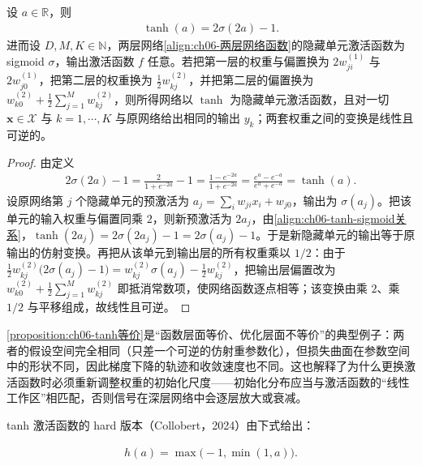 \documentclass[../../main.tex]{subfiles}
\begin{document}
\begin{proposition}\label{proposition:ch06-tanh等价}
设 $a\in\mathbb{R}$，则
\begin{align}
\tanh(a)=2\sigma(2a)-1 .
\label{align:ch06-tanh-sigmoid关系}
\end{align}
进而设 $D,M,K\in\mathbb{N}$，两层网络\eqref{align:ch06-两层网络函数}的隐藏单元激活函数为 sigmoid $\sigma$，输出激活函数 $f$ 任意。若把第一层的权重与偏置换为 $2w_{ji}^{(1)}$ 与 $2w_{j0}^{(1)}$，把第二层的权重换为 $\tfrac12w_{kj}^{(2)}$，并把第二层的偏置换为 $w_{k0}^{(2)}+\tfrac12\sum_{j=1}^{M}w_{kj}^{(2)}$，则所得网络以 $\tanh$ 为隐藏单元激活函数，且对一切 $\boldsymbol{x}\in\mathcal{X}$ 与 $k=1,\cdots,K$ 与原网络给出相同的输出 $y_{k}$；两套权重之间的变换是线性且可逆的。
\end{proposition}

\begin{proof}
由定义
\begin{align}
2\sigma(2a)-1=\frac{2}{1+e^{-2a}}-1=\frac{1-e^{-2a}}{1+e^{-2a}}=\frac{e^{a}-e^{-a}}{e^{a}+e^{-a}}=\tanh(a).
\end{align}
设原网络第 $j$ 个隐藏单元的预激活为 $a_j=\sum_i w_{ji}x_i+w_{j0}$，输出为 $\sigma(a_j)$。把该单元的输入权重与偏置同乘 $2$，则新预激活为 $2a_j$，由\eqref{align:ch06-tanh-sigmoid关系}，$\tanh(2a_j)=2\sigma(2a_j)-1=2\sigma(a_j)-1$。于是新隐藏单元的输出等于原输出的仿射变换。再把从该单元到输出层的所有权重乘以 $1/2$：由于 $\tfrac12w_{kj}^{(2)}\bigl(2\sigma(a_j)-1\bigr)=w_{kj}^{(2)}\sigma(a_j)-\tfrac12w_{kj}^{(2)}$，把输出层偏置改为 $w_{k0}^{(2)}+\tfrac12\sum_{j=1}^{M}w_{kj}^{(2)}$ 即抵消常数项，使网络函数逐点相等；该变换由乘 $2$、乘 $1/2$ 与平移组成，故线性且可逆。
\end{proof}

\begin{remark}\cref{proposition:ch06-tanh等价}是“函数层面等价、优化层面不等价”的典型例子：两者的假设空间完全相同（只差一个可逆的仿射重参数化），但损失曲面在参数空间中的形状不同，因此梯度下降的轨迹和收敛速度也不同。这也解释了为什么更换激活函数时必须重新调整权重的初始化尺度——初始化分布应当与激活函数的“线性工作区”相匹配，否则信号在深层网络中会逐层放大或衰减。
\end{remark}

tanh 激活函数的 hard 版本（Collobert，2024）由下式给出：

\begin{align}
h(a)=\max\bigl(-1,\min(1,a)\bigr).
\label{align:ch06-hard-tanh}
\end{align}
\end{document}
